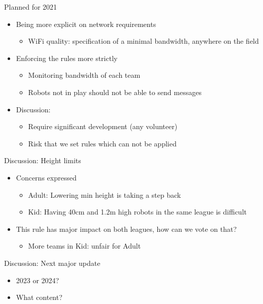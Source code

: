 \documentclass[xcolor=dvipsnames]{beamer}
\begin{document}
\begin{frame}{Planned for 2021}
  \begin{itemize}
  \item Being more explicit on network requirements
    \begin{itemize}
    \item WiFi quality: specification of a minimal bandwidth, anywhere on the field
    \end{itemize}
  \item Enforcing the rules more strictly
    \begin{itemize}
    \item Monitoring bandwidth of each team
    \item Robots not in play should not be able to send messages
    \end{itemize}
  \item Discussion:
    \begin{itemize}
    \item Require significant development (any volunteer)
    \item Risk that we set rules which can not be applied
    \end{itemize}
  \end{itemize}
\end{frame}

\begin{frame}{Discussion: Height limits}
  \begin{itemize}
  \item Concerns expressed
    \begin{itemize}
    \item Adult: Lowering min height is taking a step back
    \item Kid: Having 40cm and 1.2m high robots in the same league is difficult
    \end{itemize}
  \item This rule has major impact on both leagues, how can we vote on that?
    \begin{itemize}
    \item More teams in Kid: unfair for Adult
    \end{itemize}
  \end{itemize}
\end{frame}

\begin{frame}{Discussion: Next major update}
  \begin{itemize}
  \item 2023 or 2024?
  \item What content?
  \end{itemize}
\end{frame}
\end{document}
